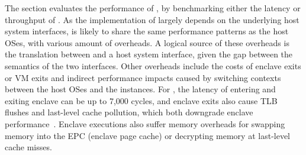 The section evaluates the performance of \thehostabi{},
by benchmarking 
either the latency or throughput of \hostapis{}.
As the implementation of \hostapis{} largely depends on
the underlying host system interfaces,
\thehostabi{} is likely to share the same performance patterns
as the host OSes,
with various amount of overheads.
A logical source of these overheads
is the translation between \hostapis{}
and a host system interface,
given the gap between the semantics of the two interfaces.
Other overheads include the costs of enclave exits or VM exits and indirect performance impacts
caused by switching contexts between the host OSes and the \libos{} instances.
For \sgx{}, the latency of entering and exiting enclave can be up to \roughly{}7,000 cycles,
and enclave exits also cause TLB flushes and last-level cache pollution, which both downgrade enclave performance~\cite{orenbach17eleos}.
Enclave executions also suffer memory overheads
for swapping memory into the EPC (enclave page cache)
or decrypting memory
at last-level cache misses.


